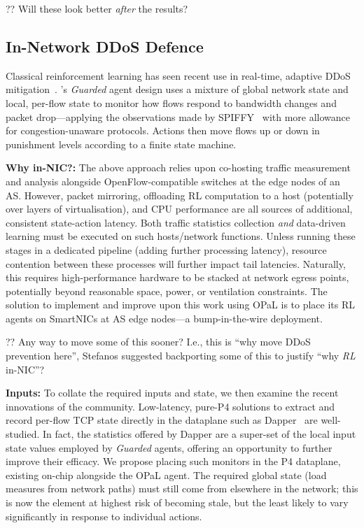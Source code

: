 \documentclass[sigconf,natbib=false]{acmart}
\newcommand{\fakepara}[1]{\noindent\textbf{#1:}}
\newcommand{\approachshort}{OPaL}
\begin{document}
?? Will these look better \emph{after} the results?

\subsection{In-Network DDoS Defence}\label{sec:integ-1}
Classical reinforcement learning has seen recent use in real-time, adaptive DDoS mitigation~\parencite{DBLP:journals/tnsm/SimpsonRP20}.
's \emph{Guarded} agent design uses a mixture of global network state and local, per-flow state to monitor how flows respond to bandwidth changes and packet drop---applying the observations made by SPIFFY~\parencite{DBLP:conf/ndss/KangGS16} with more allowance for congestion-unaware protocols.
Actions then move flows up or down in punishment levels according to a finite state machine.

\fakepara{Why in-NIC?}
The above approach relies upon co-hosting traffic measurement and analysis alongside OpenFlow-compatible switches at the edge nodes of an AS.
However, packet mirroring, offloading RL computation to a host (potentially over layers of virtualisation), and CPU performance are all sources of additional, consistent state-action latency.
Both traffic statistics collection \emph{and} data-driven learning must be executed on such hosts/network functions.
Unless running these stages in a dedicated pipeline (adding further processing latency), resource contention between these processes will further impact tail latencies.
Naturally, this requires high-performance hardware to be stacked at network egress points, potentially beyond reasonable space, power, or ventilation constraints.
The solution to implement and improve upon this work using \approachshort{} is to place its RL agents on SmartNICs at AS edge nodes---a bump-in-the-wire deployment.

?? Any way to move some of this sooner? I.e., this is ``why move DDoS prevention here'', Stefanos suggested backporting some of this to justify ``why \emph{RL} in-NIC''?

\fakepara{Inputs}
To collate the required inputs and state, we then examine the recent innovations of the community.
Low-latency, pure-P4 solutions to extract and record per-flow TCP state directly in the dataplane such as Dapper~\parencite{DBLP:conf/sosr/GhasemiBR17} are well-studied.
In fact, the statistics offered by Dapper are a super-set of the local input state values employed by \emph{Guarded} agents, offering an opportunity to further improve their efficacy. 
We propose placing such monitors in the P4 dataplane, existing on-chip alongside the \approachshort{} agent.
The required global state (load measures from network paths) must still come from elsewhere in the network; this is now the element at highest risk of becoming stale, but the least likely to vary significantly in response to individual actions.
\end{document}
